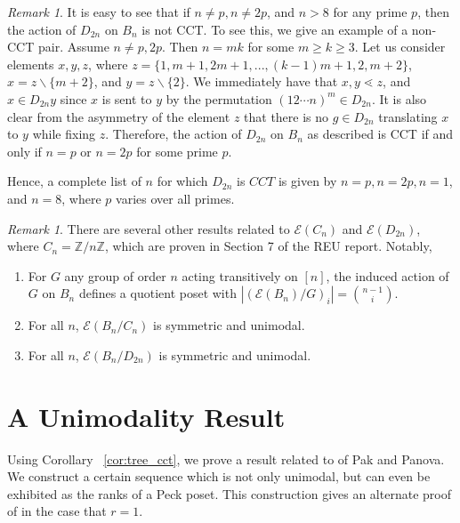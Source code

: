 \documentclass[smallextended, envcountsame, numbook]{svjour3}
\theoremstyle{plain}
\theoremstyle{definition}
\theoremstyle{remark}
\newtheorem{rmk}[thm]{Remark}
\numberwithin{equation}{section}
\begin{document}
\begin{rmk}
\label{rem:iff_dihedral_cct}
It is easy to see that if $n \neq p,n \neq 2p$, and $n >8$ for any prime $p$, then the action of $D_{2n}$ on $B_n$ is not CCT. To see this, we give an example of a non-CCT pair. Assume $n \ne p, 2 p$.  Then $n = mk$ for some $m \ge k \ge 3$. Let us consider elements $x, y, z$, where $z = \{1, m+1, 2m+1, ..., (k-1)m+1, 2, m+2\}$, $x = z \backslash \{m+2\}$, and $y = z \backslash \{2\}$. We immediately have that $x, y \lessdot z$, and $x \in D_{2n} y$ since $x$ is sent to $y$ by the permutation $(12\cdots n)^m \in D_{2n}$. It is also clear from the asymmetry of the element $z$ that there is no $g \in D_{2n}$ translating $x$ to $y$ while fixing $z$. Therefore, the action of $D_{2n}$ on $B_n$ as described is CCT if and only if $n =p$ or $n = 2p$ for some prime $p$.

Hence, a complete list of $n$ for which $D_{2n}$ is $CCT$ is given by $n = p,n = 2p, n = 1$, and $n = 8$, where $p$ varies over all primes.
\end{rmk}

\begin{rmk}
There are several other results related to $\mathcal E(C_n)$ and $\mathcal E(D_{2n})$, where $C_n = \mathbb Z/n\mathbb Z$, which are proven in Section 7 of the REU report. Notably,
\begin{enumerate}
	\item For $G$ any group of order $n$ acting transitively on $[n]$, the induced action of $G$ on $B_n$ defines a quotient poset with $|(\mathcal E(B_n)/G)_i| = \binom {n-1} i$.
	\item For all $n$, $\mathcal E(B_n/C_n)$ is symmetric and unimodal.
	\item For all $n$, $\mathcal E(B_n/D_{2n})$ is symmetric and unimodal.
\end{enumerate}
\end{rmk}



\section{A Unimodality Result}\label{sec:wreath_product}

Using Corollary ~\ref{cor:tree_cct}, we prove a result related to \cite[Theorem 1.1]{pak} of Pak and Panova. We construct a certain sequence which is not only unimodal, but can even be exhibited as the ranks of a Peck poset. This construction gives an alternate proof of \cite[Theorem 1.1]{pak} in the case that $r = 1$.
\end{document}
